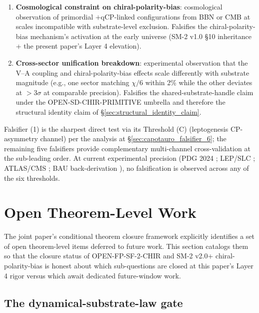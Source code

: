 \documentclass[11pt,letterpaper]{article}
\begin{document}
\begin{enumerate}[leftmargin=*]
\item \textbf{Cosmological constraint on chiral-polarity-bias}: cosmological observation of primordial $+$qCP-linked configurations from BBN or CMB at scales incompatible with substrate-level exclusion. Falsifies the chiral-polarity-bias mechanism's activation at the early universe (SM-2 v1.0 §10 inheritance + the present paper's Layer 4 elevation).

\item \textbf{Cross-sector unification breakdown}: experimental observation that the V--A coupling and chiral-polarity-bias effects scale differently with substrate magnitude (e.g., one sector matching $\chi/6$ within 2\% while the other deviates at $>3\sigma$ at comparable precision). Falsifies the shared-substrate-handle claim under the OPEN-SD-CHIR-PRIMITIVE umbrella and therefore the structural identity claim of §\ref{sec:structural_identity_claim}.
\end{enumerate}

Falsifier (1) is the sharpest direct test via its Threshold (C) (leptogenesis CP-asymmetry channel) per the analysis at §\ref{sec:capotauro_falsifier_6}; the remaining five falsifiers provide complementary multi-channel cross-validation at the sub-leading order. At current experimental precision (PDG 2024 \cite{PDG2024}; LEP/SLC \cite{LEPElectroweak}; ATLAS/CMS \cite{ATLASTopSpin, CMSTopSpin}; BAU back-derivation \cite{DavidsonNardiNir}), no falsification is observed across any of the six thresholds.

\section{Open Theorem-Level Work}
\label{sec:open_work}

The joint paper's conditional theorem closure framework explicitly identifies a set of open theorem-level items deferred to future work. This section catalogs them so that the closure status of OPEN-FP-SF-2-CHIR and SM-2 v2.0+ chiral-polarity-bias is honest about which sub-questions are closed at this paper's Layer 4 rigor versus which await dedicated future-window work.

\subsection{The dynamical-substrate-law gate}
\label{sec:dynamical_gate}
\end{document}
